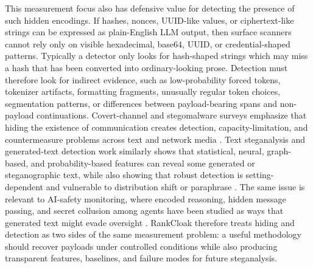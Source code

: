 \documentclass[fleqn,10pt]{wlscirep}
\begin{document}
This measurement focus also has defensive value for detecting the presence of such hidden encodings. If hashes, nonces, UUID-like values, or ciphertext-like strings can be expressed as plain-English LLM output, then surface scanners cannot rely only on visible hexadecimal, base64, UUID, or credential-shaped patterns. Typically a detector only looks for hash-shaped strings which may miss a hash that has been converted into ordinary-looking prose. Detection must therefore look for indirect evidence, such as low-probability forced tokens, tokenizer artifacts, formatting fragments, unusually regular token choices, segmentation patterns, or differences between payload-bearing spans and non-payload continuations. Covert-channel and stegomalware surveys emphasize that hiding the existence of communication creates detection, capacity-limitation, and countermeasure problems across text and network media \cite{Zander2007CovertChannelsCountermeasures,Badar2025StegomalwareSurvey}. Text steganalysis and generated-text detection work similarly shows that statistical, neural, graph-based, and probability-based features can reveal some generated or steganographic text, while also showing that robust detection is setting-dependent and vulnerable to distribution shift or paraphrase \cite{Wen2019CNNTextSteganalysis,Wu2021GNNLinguisticSteganalysis,Wang2023FewShotLinguisticSteganalysis,Bai2024NextGenerationSteganalysis,Gehrmann2019GLTR,Mitchell2023DetectGPT,Sadasivan2023AIDetection}. The same issue is relevant to AI-safety monitoring, where encoded reasoning, hidden message passing, and secret collusion among agents have been studied as ways that generated text might evade oversight \cite{RogerGreenblatt2023HidingReasoning,Motwani2024SecretCollusion,Zolkowski2025EarlySignsSteganographicCapabilities}. RankCloak therefore treats hiding and detection as two sides of the same measurement problem: a useful methodology should recover payloads under controlled conditions while also producing transparent features, baselines, and failure modes for future steganalysis.
\end{document}
